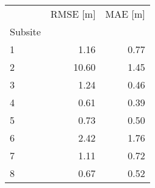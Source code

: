 \begin{table}[htbp]
\centering
\label{tab:Oahusitestats}
\begin{tabular}{lrr}
\toprule
 & RMSE [m] & MAE [m] \\
Subsite &  &  \\
\midrule
1 & 1.16 & 0.77 \\
2 & 10.60 & 1.45 \\
3 & 1.24 & 0.46 \\
4 & 0.61 & 0.39 \\
5 & 0.73 & 0.50 \\
6 & 2.42 & 1.76 \\
7 & 1.11 & 0.72 \\
8 & 0.67 & 0.52 \\
\bottomrule
\end{tabular}
\end{table}
